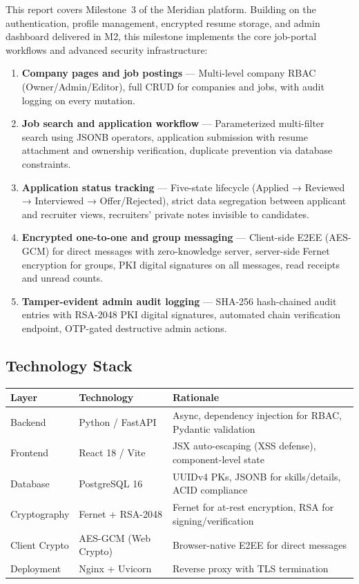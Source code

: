 \documentclass[12pt, a4paper]{article}
\begin{document}
This report covers Milestone~3 of the Meridian platform. Building on the authentication, profile management, encrypted resume storage, and admin dashboard delivered in M2, this milestone implements the core job-portal workflows and advanced security infrastructure:

\begin{enumerate}
    \item \textbf{Company pages and job postings} — Multi-level company RBAC (Owner/Admin/Editor), full CRUD for companies and jobs, with audit logging on every mutation.
    \item \textbf{Job search and application workflow} — Parameterized multi-filter search using JSONB operators, application submission with resume attachment and ownership verification, duplicate prevention via database constraints.
    \item \textbf{Application status tracking} — Five-state lifecycle (Applied → Reviewed → Interviewed → Offer/Rejected), strict data segregation between applicant and recruiter views, recruiters' private notes invisible to candidates.
    \item \textbf{Encrypted one-to-one and group messaging} — Client-side E2EE (AES-GCM) for direct messages with zero-knowledge server, server-side Fernet encryption for groups, PKI digital signatures on all messages, read receipts and unread counts.
    \item \textbf{Tamper-evident admin audit logging} — SHA-256 hash-chained audit entries with RSA-2048 PKI digital signatures, automated chain verification endpoint, OTP-gated destructive admin actions.
\end{enumerate}

\subsection{Technology Stack}

\begin{table}[H]
\centering
\small
\begin{tabular}{p{3cm} p{4cm} p{6cm}}
    \toprule
    \textbf{Layer} & \textbf{Technology} & \textbf{Rationale} \\
    \midrule
    Backend & Python / FastAPI & Async, dependency injection for RBAC, Pydantic validation \\
    Frontend & React 18 / Vite & JSX auto-escaping (XSS defense), component-level state \\
    Database & PostgreSQL 16 & UUIDv4 PKs, JSONB for skills/details, ACID compliance \\
    Cryptography & Fernet + RSA-2048 & Fernet for at-rest encryption, RSA for signing/verification \\
    Client Crypto & AES-GCM (Web Crypto) & Browser-native E2EE for direct messages \\
    Deployment & Nginx + Uvicorn & Reverse proxy with TLS termination \\
    \bottomrule
\end{tabular}
\end{table}
\end{document}
